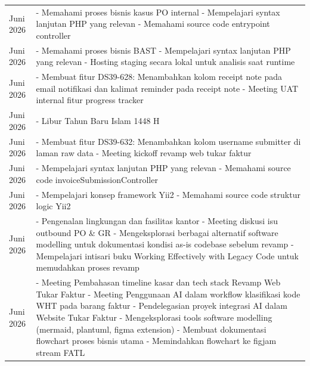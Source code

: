 \begin{longtable}{>{\raggedright\arraybackslash}p{2.7cm} >{\raggedright\arraybackslash}p{\dimexpr\textwidth-2.7cm-4\tabcolsep\relax}}
    11 Juni 2026 & - Memahami proses bisnis kasus PO internal \newline - Mempelajari syntax lanjutan PHP yang relevan \newline - Memahami source code entrypoint controller \\
    12 Juni 2026 & - Memahami proses bisnis BAST \newline - Mempelajari syntax lanjutan PHP yang relevan \newline - Hosting staging secara lokal untuk analisis saat runtime \\
    15 Juni 2026 & - Membuat fitur DS39-628: Menambahkan kolom receipt note pada email notifikasi dan kalimat reminder pada receipt note \newline - Meeting UAT internal fitur progress tracker \\
    16 Juni 2026 & - Libur Tahun Baru Islam 1448 H \\
    17 Juni 2026 & - Membuat fitur DS39-632: Menambahkan kolom username submitter di laman raw data \newline - Meeting kickoff revamp web tukar faktur \\
    18 Juni 2026 & - Mempelajari syntax lanjutan PHP yang relevan \newline - Memahami source code invoiceSubmissionController \\
    19 Juni 2026 & - Mempelajari konsep framework Yii2 \newline - Memahami source code struktur logic Yii2 \\
    22 Juni 2026 & - Pengenalan lingkungan dan fasilitas kantor \newline - Meeting diskusi isu outbound PO \& GR \newline - Mengeksplorasi berbagai alternatif software modelling untuk dokumentasi kondisi as-is codebase sebelum revamp \newline - Mempelajari intisari buku Working Effectively with Legacy Code untuk memudahkan proses revamp \\
    23 Juni 2026 & - Meeting Pembahasan timeline kasar dan tech stack Revamp Web Tukar Faktur \newline - Meeting Penggunaan AI dalam workflow klasifikasi kode WHT pada barang faktur \newline - Pendelegasian proyek integrasi AI dalam Website Tukar Faktur \newline - Mengeksplorasi tools software modelling (mermaid, plantuml, figma extension) \newline - Membuat dokumentasi flowchart proses bisnis utama \newline - Memindahkan flowchart ke figjam stream FATL \\

\end{longtable}
